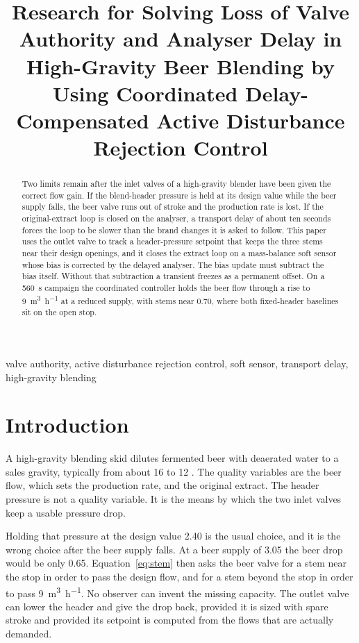 \documentclass[conference,a4paper]{IEEEtran}
\title{Research for Solving Loss of Valve Authority and Analyser Delay in High-Gravity Beer Blending by Using Coordinated Delay-Compensated Active Disturbance Rejection Control}
\author{%
\IEEEauthorblockN{Thesis draft}%
\IEEEauthorblockA{Automatic control, 2026}%
}
\begin{document}
\maketitle

\begin{abstract}
Two limits remain after the inlet valves of a high-gravity blender have been given the correct flow gain. If the blend-header pressure is held at its design value while the beer supply falls, the beer valve runs out of stroke and the production rate is lost. If the original-extract loop is closed on the analyser, a transport delay of about ten seconds forces the loop to be slower than the brand changes it is asked to follow. This paper uses the outlet valve to track a header-pressure setpoint that keeps the three stems near their design openings, and it closes the extract loop on a mass-balance soft sensor whose bias is corrected by the delayed analyser. The bias update must subtract the bias itself. Without that subtraction a transient freezes as a permanent offset. On a \SI{560}{s} campaign the coordinated controller holds the beer flow through a rise to \SI{9}{\cubic\metre\per\hour} at a reduced supply, with stems near $0.70$, where both fixed-header baselines sit on the open stop.
\end{abstract}

\begin{IEEEkeywords}
valve authority, active disturbance rejection control, soft sensor, transport delay, high-gravity blending
\end{IEEEkeywords}

\section{Introduction}
A high-gravity blending skid dilutes fermented beer with deaerated water to a sales gravity, typically from about \SI{16}{\plato} to \SI{12}{\plato} \cite{kunze2014brewing,stewart2010highgravity}. The quality variables are the beer flow, which sets the production rate, and the original extract. The header pressure is not a quality variable. It is the means by which the two inlet valves keep a usable pressure drop.

Holding that pressure at the design value \SI{2.40}{\barg} is the usual choice, and it is the wrong choice after the beer supply falls. At a beer supply of \SI{3.05}{\barg} the beer drop would be only \SI{0.65}{\barg}. Equation~\eqref{eq:stem} then asks the beer valve for a stem near the stop in order to pass the design flow, and for a stem beyond the stop in order to pass \SI{9}{\cubic\metre\per\hour}. No observer can invent the missing capacity. The outlet valve can lower the header and give the drop back, provided it is sized with spare stroke and provided its setpoint is computed from the flows that are actually demanded.
\end{document}
